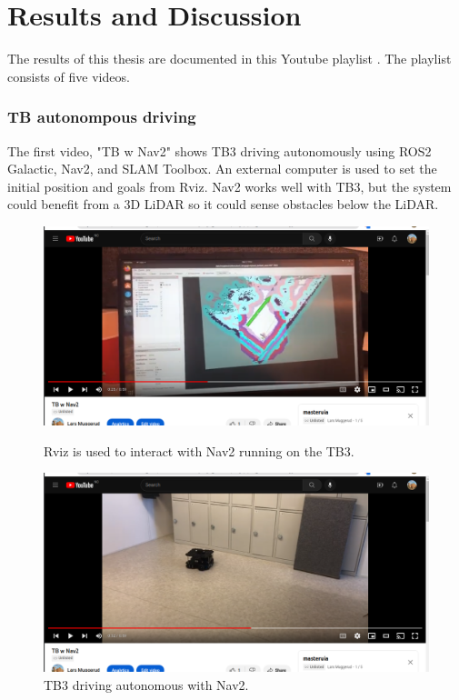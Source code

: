 \chapter{Results and Discussion} \label{Results and discussion}


The results of this thesis are documented in this Youtube playlist \cite{youtube_playlist_results}. The playlist consists of five videos. 

\subsection{TB autonompous driving}
The first video, "TB w Nav2" shows TB3 driving autonomously using ROS2 Galactic, Nav2, and SLAM Toolbox. An external computer is used to set the initial position and goals from Rviz. Nav2 works well with TB3, but the system could benefit from a 3D LiDAR so it could sense obstacles below the LiDAR. 
\begin{figure}[H]
  \centering
  \begin{minipage}[b]{0.5\textwidth}
    \includegraphics[width=\textwidth]{Figures/YouTube/TB w Nav2 1.png}
    \caption{Rviz is used to interact with Nav2 running on the TB3.}
    \label{fig:TB w Nav2 1.png}
  \end{minipage}
  \hfill
  \begin{minipage}[b]{0.49\textwidth}
    \includegraphics[width=\textwidth]{Figures/YouTube/TB w Nav2 2.png}
    \caption{TB3 driving autonomous with Nav2.}
    \label{fig:TB w Nav2 2}
  \end{minipage}
\end{figure}

